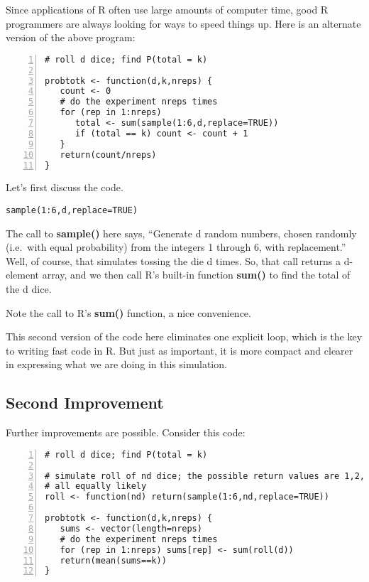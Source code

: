 Since applications of R often use large amounts of computer time, good R
programmers are always looking for ways to speed things up.  Here is an
alternate version of the above program:

\begin{Verbatim}[fontsize=\relsize{-2},numbers=left]
# roll d dice; find P(total = k)

probtotk <- function(d,k,nreps) {
   count <- 0
   # do the experiment nreps times
   for (rep in 1:nreps) 
      total <- sum(sample(1:6,d,replace=TRUE))
      if (total == k) count <- count + 1
   }
   return(count/nreps)
}
\end{Verbatim}

Let's first discuss the code.

\begin{Verbatim}[fontsize=\relsize{-2}]
sample(1:6,d,replace=TRUE)
\end{Verbatim}

The call to {\bf sample()} here says, ``Generate d random numbers,
chosen randomly (i.e.\ with equal probability) from the integers 1
through 6, with replacement.''  Well, of course, that simulates tossing
the die d times.  So, that call returns a d-element array, and we then
call R's built-in function {\bf sum()} to find the total of the d dice.

Note the call to R's {\bf sum()} function, a nice convenience.

This second version of the code here eliminates one explicit loop, which
is the key to writing fast code in R.  But just as important, it is more
compact and clearer in expressing what we are doing in this simulation.

\subsection{Second Improvement}

Further improvements are possible.  Consider this code: 

\begin{Verbatim}[fontsize=\relsize{-2},numbers=left]
# roll d dice; find P(total = k)

# simulate roll of nd dice; the possible return values are 1,2,3,4,5,6,
# all equally likely
roll <- function(nd) return(sample(1:6,nd,replace=TRUE))

probtotk <- function(d,k,nreps) {
   sums <- vector(length=nreps)
   # do the experiment nreps times
   for (rep in 1:nreps) sums[rep] <- sum(roll(d))
   return(mean(sums==k))
}
\end{Verbatim}

